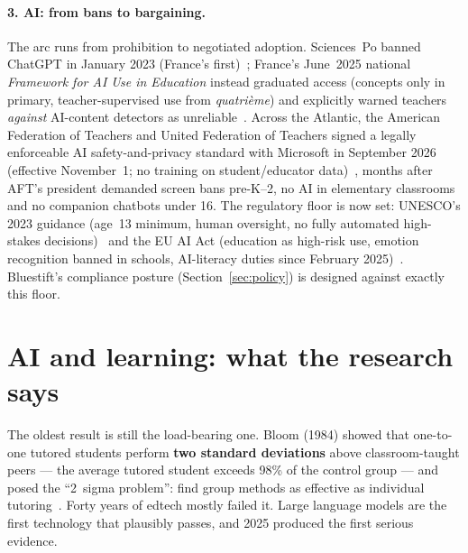 \documentclass[11pt,a4paper]{article}
\let\oldsection\section
\renewcommand{\section}{\clearpage\oldsection}
\begin{document}
\paragraph{3. AI: from bans to bargaining.} The arc runs from prohibition to
negotiated adoption. Sciences~Po banned ChatGPT in January 2023 (France's
first)~\cite{sciencespo-2023}; France's June~2025 national \emph{Framework for
AI Use in Education} instead graduated access (concepts only in primary,
teacher-supervised use from \emph{quatri\`eme}) and explicitly warned teachers
\emph{against} AI-content detectors as unreliable~\cite{france-men-ai-2025}.
Across the Atlantic, the American Federation of Teachers and United Federation
of Teachers signed a legally enforceable AI safety-and-privacy standard with
Microsoft in September 2026 (effective November~1; no training on
student/educator data)~\cite{aft-microsoft-2026}, months after AFT's president
demanded screen bans pre-K--2, no AI in elementary classrooms and no companion
chatbots under 16. The regulatory floor is now set: UNESCO's 2023 guidance
(age~13 minimum, human oversight, no fully automated high-stakes
decisions)~\cite{unesco-ai-2023} and the EU AI Act (education as high-risk use,
emotion recognition banned in schools, AI-literacy duties since February
2025)~\cite{eu-aiact-2024}. Bluestift's compliance posture
(Section~\ref{sec:policy}) is designed against exactly this floor.

\section{AI and learning: what the research says}
\label{sec:research}

The oldest result is still the load-bearing one. Bloom (1984) showed that
one-to-one tutored students perform \textbf{two standard deviations} above
classroom-taught peers --- the average tutored student exceeds 98\% of the
control group --- and posed the ``2~sigma problem'': find group methods as
effective as individual tutoring~\cite{bloom-1984}. Forty years of edtech
mostly failed it. Large language models are the first technology that plausibly
passes, and 2025 produced the first serious evidence.
\end{document}
